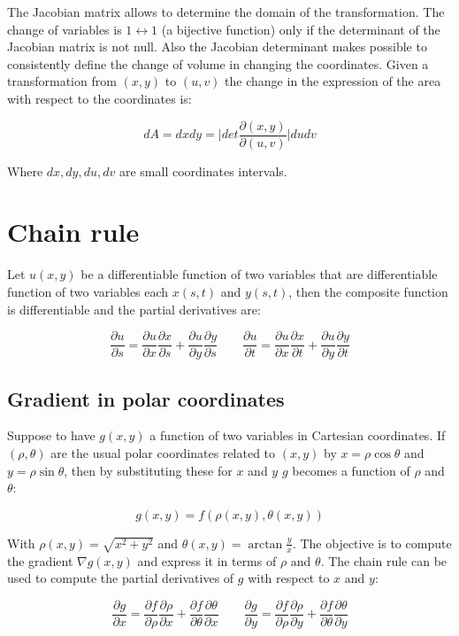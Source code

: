 The Jacobian matrix allows to determine the domain of the transformation.
The change of variables is $1\leftrightarrow 1$ (a bijective function) only if the determinant of the Jacobian matrix is not null.
Also the Jacobian determinant makes possible to consistently define the change of volume in changing the coordinates.
Given a transformation from $(x, y)$ to $(u, v)$ the change in the expression of the area with respect to the coordinates is:

$$dA = dxdy = \biggl| det\frac{\partial(x, y)}{\partial(u, v)}\biggr|dudv$$

Where $dx, dy, du, dv$ are small coordinates intervals.

\section{Chain rule}
Let $u(x, y)$ be a differentiable function of two variables that are differentiable function of two variables each $x(s, t)$ and $y(s, t)$, then the composite function is differentiable and the partial derivatives are:

$$\frac{\partial u}{\partial s} = \frac{\partial u}{\partial x}\frac{\partial x}{\partial s} + \frac{\partial u}{\partial y}\frac{\partial y}{\partial s}\qquad\frac{\partial u}{\partial t} = \frac{\partial u}{\partial x}\frac{\partial x}{\partial t} + \frac{\partial u}{\partial y}\frac{\partial y}{\partial t}$$

	\subsection{Gradient in polar coordinates}
	Suppose to have $g(x, y)$ a function of two variables in Cartesian coordinates.
	If $(\rho, \theta)$ are the usual polar coordinates related to $(x, y)$ by $x = \rho\cos\theta$ and $y =\rho\sin\theta$, then by substituting these for $x$ and $y$ $g$ becomes a function of $\rho$ and $\theta$:

	$$g(x, y) = f(\rho(x, y), \theta(x, y))$$

	With $\rho(x,y) =\sqrt{x^2+y^2}$ and $\theta(x, y) = \arctan\frac{y}{x}$.
	The objective is to compute the gradient $\nabla g(x,y)$ and express it in terms of $\rho$ and $\theta$.
	The chain rule can be used to compute the partial derivatives of $g$ with respect to $x$ and $y$:

	$$\frac{\partial g}{\partial x} = \frac{\partial f}{\partial \rho}\frac{\partial \rho}{\partial x} + \frac{\partial f}{\partial \theta}\frac{\partial \theta}{\partial x}\qquad\frac{\partial g}{\partial y} = \frac{\partial f}{\partial \rho}\frac{\partial \rho}{\partial y} + \frac{\partial f}{\partial \theta}\frac{\partial \theta}{\partial y}$$

